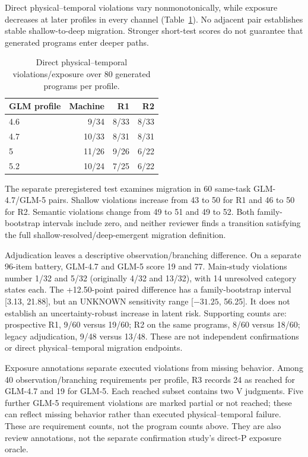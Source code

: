 \documentclass[letterpaper,10pt,conference]{ieeeconf}
\begin{document}
Direct physical--temporal violations vary nonmonotonically, while exposure decreases at later profiles in every channel (Table~\ref{tab:rq4direct}). No adjacent pair establishes stable shallow-to-deep migration. Stronger short-test scores do not guarantee that generated programs enter deeper paths.

\begin{table}[t]
\vspace{5pt}
\caption{Direct physical--temporal violations/exposure over 80 generated programs per profile.}
\label{tab:rq4direct}
\centering\small
\begin{tabular}{lrrr}
\toprule
GLM profile&Machine&R1&R2\\
\midrule
4.6&9/34&8/33&8/33\\
4.7&10/33&8/31&8/31\\
5&11/26&9/26&6/22\\
5.2&10/24&7/25&6/22\\
\bottomrule
\end{tabular}
\end{table}

The separate preregistered test examines migration in 60 same-task GLM-4.7/GLM-5 pairs. Shallow violations increase from 43 to 50 for R1 and 46 to 50 for R2. Semantic violations change from 49 to 51 and 49 to 52. Both family-bootstrap intervals include zero, and neither reviewer finds a transition satisfying the full shallow-resolved/deep-emergent migration definition.

Adjudication leaves a descriptive observation/branching difference. On a separate 96-item battery, GLM-4.7 and GLM-5 score 19 and 77. Main-study violations number 1/32 and 5/32 (originally 4/32 and 13/32), with 14 unresolved category states each. The +12.50-point paired difference has a family-bootstrap interval [3.13, 21.88], but an UNKNOWN sensitivity range [$-31.25$, 56.25]. It does not establish an uncertainty-robust increase in latent risk. Supporting counts are: prospective R1, 9/60 versus 19/60; R2 on the same programs, 8/60 versus 18/60; legacy adjudication, 9/48 versus 13/48. These are not independent confirmations or direct physical--temporal migration endpoints.

Exposure annotations separate executed violations from missing behavior. Among 40 observation/branching requirements per profile, R3 records 24 as reached for GLM-4.7 and 19 for GLM-5. Each reached subset contains two V judgments. Five further GLM-5 requirement violations are marked partial or not reached; these can reflect missing behavior rather than executed physical--temporal failure. These are requirement counts, not the program counts above. They are also review annotations, not the separate confirmation study's direct-P exposure oracle.
\end{document}
